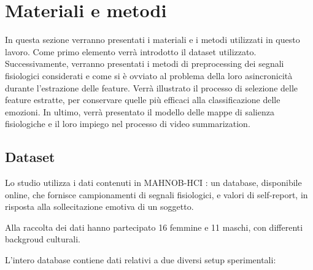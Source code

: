 \section{Materiali e metodi}

In questa sezione verranno presentati i materiali e i metodi utilizzati in questo lavoro. Come primo elemento verrà introdotto il dataset utilizzato. Successivamente, verranno presentati i metodi di preprocessing dei segnali fisiologici considerati e come si è ovviato al problema della loro asincronicità durante l'estrazione delle feature.
Verrà illustrato il processo di selezione delle feature estratte, per conservare quelle più efficaci alla classificazione delle emozioni.
In ultimo, verrà presentato il modello delle mappe di salienza fisiologiche e il loro impiego nel processo di video summarization.

\subsection{Dataset}

Lo studio utilizza i dati contenuti in MAHNOB-HCI \cite{soleymani2011multimodal}: un database, disponibile online, che fornisce campionamenti di segnali fisiologici, e valori di self-report, in risposta alla sollecitazione emotiva di un soggetto.

Alla raccolta dei dati hanno partecipato 16 femmine e 11 maschi, con differenti backgroud culturali.

L'intero database contiene dati relativi a due diversi setup sperimentali:

